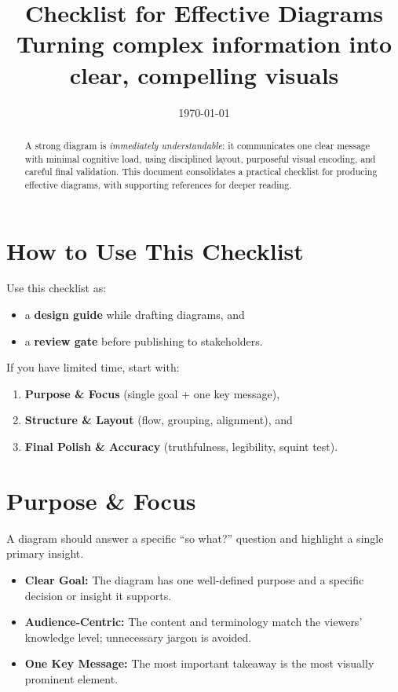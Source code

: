 \documentclass[11pt]{article}
\title{\textbf{Checklist for Effective Diagrams}\\
\large Turning complex information into clear, compelling visuals}
\author{%
  }
\date{\today}
\begin{document}
\maketitle

\begin{abstract}
A strong diagram is \emph{immediately understandable}: it communicates one clear message with minimal cognitive load, using disciplined layout, purposeful visual encoding, and careful final validation. This document consolidates a practical checklist for producing effective diagrams, with supporting references for deeper reading.\cite{ref1,ref2}
\end{abstract}

\tableofcontents
\newpage

\section{How to Use This Checklist}
Use this checklist as:
\begin{itemize}
  \item a \textbf{design guide} while drafting diagrams, and
  \item a \textbf{review gate} before publishing to stakeholders.
\end{itemize}

If you have limited time, start with:
\begin{enumerate}
  \item \textbf{Purpose \& Focus} (single goal + one key message),
  \item \textbf{Structure \& Layout} (flow, grouping, alignment), and
  \item \textbf{Final Polish \& Accuracy} (truthfulness, legibility, squint test).
\end{enumerate}

\section{Purpose \& Focus}
A diagram should answer a specific “so what?” question and highlight a single primary insight.\cite{ref2,ref3}

\begin{itemize}
  \item \textbf{Clear Goal:} The diagram has one well-defined purpose and a specific decision or insight it supports.
  \item \textbf{Audience-Centric:} The content and terminology match the viewers’ knowledge level; unnecessary jargon is avoided.
  \item \textbf{One Key Message:} The most important takeaway is the most visually prominent element.\cite{ref2,ref3,ref4,ref5}
\end{itemize}
\end{document}
